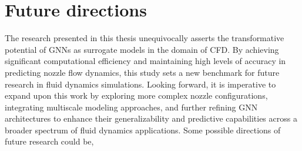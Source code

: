 \section{Future directions}

The research presented in this thesis unequivocally asserts the transformative potential of GNNs as surrogate models in the domain of CFD. By achieving significant computational efficiency and maintaining high levels of accuracy in predicting nozzle flow dynamics, this study sets a new benchmark for future research in fluid dynamics simulations. Looking forward, it is imperative to expand upon this work by exploring more complex nozzle configurations, integrating multiscale modeling approaches, and further refining GNN architectures to enhance their generalizability and predictive capabilities across a broader spectrum of fluid dynamics applications. Some possible directions of future research could be, 
